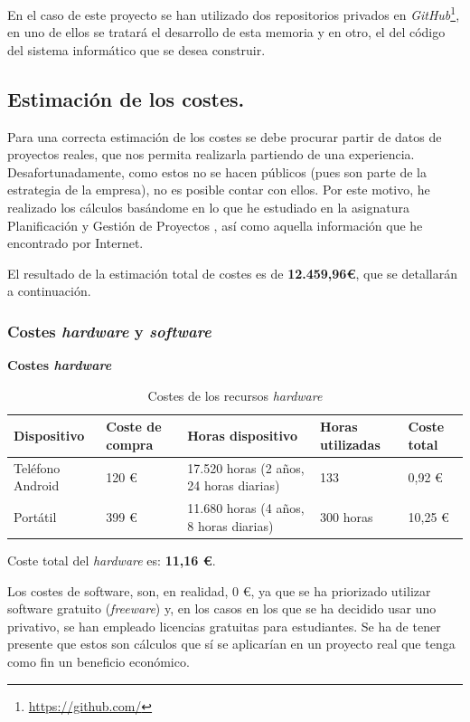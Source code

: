 \documentclass[twoside]{report}
\begin{document}
En el caso de este proyecto se han utilizado dos repositorios privados en \textit{GitHub}\footnote{\url{https://github.com/}}, en uno de ellos se tratará el desarrollo de esta memoria y en otro, el del código del sistema informático que se desea construir.

\subsection{Estimación de los costes.}

Para una correcta estimación de los costes se debe procurar partir de datos de proyectos reales, que nos permita realizarla partiendo de una experiencia. Desafortunadamente, como estos no se hacen públicos (pues son parte de la estrategia de la empresa), no es posible contar con ellos. Por este motivo, he realizado los cálculos basándome en lo que he estudiado en la asignatura Planificación y Gestión de Proyectos \cite{pgptema2}, así como aquella información que he encontrado por Internet.

El resultado de la estimación total de costes es de \textbf{12.459,96\euro}, que se detallarán a continuación.

\subsubsection{Costes \textit{hardware} y \textit{software}}
\textbf{Costes \textit{hardware}}
\begin{table}[H]
\center
\begin{tabular}{|l|l|l|l|l|}
\hline
Dispositivo        & Coste de compra   & Horas dispositivo & Horas utilizadas & Coste total \\ \hline
Teléfono Android   & 120 \euro      & 17.520 horas (2 años, 24 horas diarias)  & 133  & 0,92  \euro \\ \hline
Portátil      & 399 \euro   &  11.680 horas (4 años, 8 horas diarias) & 300 horas  & 10,25 \euro \\ \hline
\end{tabular}
\caption{Costes de los recursos \textit{hardware}}
\end{table}

Coste total del \textit{hardware} es: \textbf{11,16 \euro}.

Los costes de software, son, en realidad, 0 \euro, ya que se ha priorizado utilizar software gratuito (\textit{freeware}) y,  en los casos en los que se ha decidido usar uno privativo, se han empleado licencias gratuitas para estudiantes. Se ha de tener presente que estos son cálculos que sí se aplicarían en un proyecto real que tenga como fin un beneficio económico.
\end{document}
